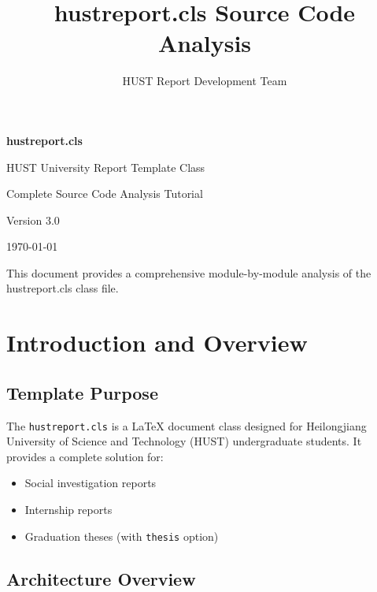 \documentclass[linux]{hustreport}
\title{hustreport.cls Source Code Analysis}
\author{HUST Report Development Team}
\begin{document}
\begin{titlepage}
    \centering
    \vspace*{3cm}
    {\Huge\bfseries\heiti hustreport.cls\par}
    \vspace{0.5cm}
    {\Large\songti HUST University Report Template Class\par}
    \vspace{1cm}
    {\large Complete Source Code Analysis Tutorial\par}
    \vspace{2cm}
    {\large Version 3.0\par}
    \vspace{0.5cm}
    {\large \today\par}
    \vfill
    {\small This document provides a comprehensive module-by-module analysis of the hustreport.cls class file.\par}
\end{titlepage}

\tableofcontents
\newpage

\section{Introduction and Overview}

\subsection{Template Purpose}

The \texttt{hustreport.cls} is a \LaTeX{} document class designed for Heilongjiang University of Science and Technology (HUST) undergraduate students. It provides a complete solution for:

\begin{itemize}
    \item Social investigation reports
    \item Internship reports
    \item Graduation theses (with \texttt{thesis} option)
\end{itemize}

\subsection{Architecture Overview}
\end{document}
